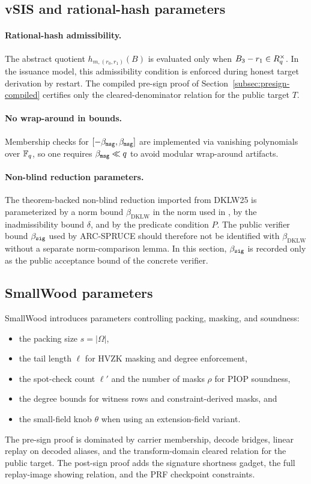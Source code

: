 \subsection{vSIS and rational-hash parameters}
\paragraph{Rational-hash admissibility.}
The abstract quotient \(h_{m,(r_0,r_1)}(B)\) is evaluated only when \(B_3-r_1\in R_q^\times\). In the issuance
model, this admissibility condition is enforced during honest target derivation by restart. The compiled pre-sign proof
of Section~\ref{subsec:presign-compiled} certifies only the cleared-denominator relation for the public target \(T\).

\paragraph{No wrap-around in bounds.}
Membership checks for \([ -\beta_{\mathtt{msg}},\beta_{\mathtt{msg}}]\) are implemented via vanishing polynomials over \(\mathbb{F}_q\), so one
requires \(\beta_{\mathtt{msg}} \ll q\) to avoid modular wrap-around artifacts.

\paragraph{Non-blind reduction parameters.}
The theorem-backed non-blind reduction imported from DKLW25 is parameterized by a norm bound
\(\beta_{\mathrm{DKLW}}\) in the norm used in \cite{EPRINT:DKLW25}, by the inadmissibility bound \(\delta\), and by
the predicate condition \(P\). The public verifier bound \(\beta_{\mathtt{sig}}\) used by ARC-SPRUCE should therefore not be
identified with \(\beta_{\mathrm{DKLW}}\) without a separate norm-comparison lemma. In this section, \(\beta_{\mathtt{sig}}\) is
recorded only as the public acceptance bound of the concrete verifier.

\subsection{SmallWood parameters}
SmallWood introduces parameters controlling packing, masking, and soundness:
\begin{itemize}[leftmargin=1.25em]
  \item the packing size \(s=|\Omega|\),
  \item the tail length \(\ell\) for HVZK masking and degree enforcement,
  \item the spot-check count \(\ell'\) and the number of masks \(\rho\) for PIOP soundness,
  \item the degree bounds for witness rows and constraint-derived masks, and
  \item the small-field knob \(\theta\) when using an extension-field variant.
\end{itemize}
The pre-sign proof is dominated by carrier membership, decode bridges, linear replay on decoded aliases, and the
transform-domain cleared relation for the public target. The post-sign proof adds the signature shortness gadget, the
full replay-image showing relation, and the PRF checkpoint constraints.

